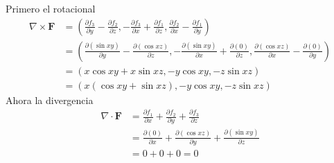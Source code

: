 \documentclass{article}
\begin{document}
\begin{enumerate}
{\begin{enumerate}
{			\color{azul}
            Primero el rotacional
            \begin{align*}
                \nabla \times \mathbf{F}
                &= (
                \frac{\partial f_3}{\partial y}
                - \frac{\partial f_2}{\partial z},
                -\frac{\partial f_3}{\partial x}
                +\frac{\partial f_1}{\partial z},
                \frac{\partial f_2}{\partial x}
                -\frac{\partial f_1}{\partial y}
                )\\
                &= (
                \frac{\partial (\sin xy)}{\partial y}
                - \frac{\partial (\cos xz)}{\partial z},
                -\frac{\partial (\sin xy)}{\partial x}
                +\frac{\partial (0)}{\partial z},
                \frac{\partial (\cos xz)}{\partial x}
                -\frac{\partial (0)}{\partial y}
                )\\
                &= (
                x\cos xy + x \sin xz, -y\cos xy, -z\sin xz
                )\\
                &= (
                x (\cos xy + \sin xz), -y\cos xy, -z\sin xz
                )
            \end{align*}
            Ahora la divergencia
            \begin{align*}
                \nabla \cdot \mathbf{F} &= \frac{\partial f_1}{\partial x}
                +\frac{\partial f_2}{\partial y}
                +\frac{\partial f_3}{\partial z} \\
                &= \frac{\partial (0)}{\partial x}
                +\frac{\partial (\cos xz)}{\partial y}
                +\frac{\partial (\sin xy)}{\partial z}\\
                &= 0 + 0 + 0 = 0
            \end{align*}
            }


\end{enumerate}}
\end{enumerate}
\end{document}
